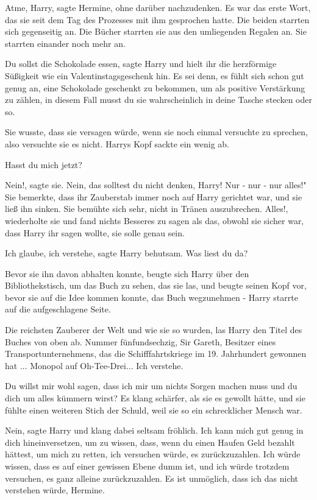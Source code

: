 \glqq Atme, Harry\grqq{}, sagte Hermine, ohne darüber nachzudenken. Es war das
erste Wort, das sie seit dem Tag des Prozesses mit ihm gesprochen hatte. Die
beiden starrten sich gegenseitig an. Die Bücher starrten sie aus den umliegenden
Regalen an. Sie starrten einander noch mehr an.

\glqq Du sollst die Schokolade essen\grqq{}, sagte Harry und hielt ihr die
herzförmige Süßigkeit wie ein Valentinstagsgeschenk hin. \glqq Es sei denn, es
fühlt sich schon gut genug an, eine Schokolade geschenkt zu bekommen, um als
positive Verstärkung zu zählen, in diesem Fall musst du sie wahrscheinlich in
deine Tasche stecken oder so.\grqq{}

Sie wusste, dass sie versagen würde, wenn sie noch einmal versuchte zu sprechen,
also versuchte sie es nicht. Harrys Kopf sackte ein wenig ab.

\glqq Hasst du mich jetzt?\grqq{}

\glqq Nein!\grqq{}, sagte sie. \glqq Nein, das solltest du nicht denken, Harry!
Nur - nur - nur alles!" Sie bemerkte, dass ihr Zauberstab immer noch auf Harry
gerichtet war, und sie ließ ihn sinken. Sie bemühte sich sehr, nicht in Tränen
auszubrechen. \glqq Alles!\grqq{}, wiederholte sie und fand nichts Besseres zu
sagen als das, obwohl sie sicher war, dass Harry ihr sagen wollte, sie solle
genau sein.

\glqq Ich glaube, ich verstehe\grqq{}, sagte Harry behutsam. \glqq Was liest du
da?\grqq{}

Bevor sie ihn davon abhalten konnte, beugte sich Harry über den
Bibliothekstisch, um das Buch zu sehen, das sie las, und beugte seinen Kopf vor,
bevor sie auf die Idee kommen konnte, das Buch wegzunehmen - Harry starrte auf
die aufgeschlagene Seite.

\glqq Die reichsten Zauberer der Welt und wie sie so wurden\grqq{}, las Harry
den Titel des Buches von oben ab. \glqq Nummer fünfundsechzig, Sir Gareth,
Besitzer eines Transportunternehmens, das die Schifffahrtskriege im 19.
Jahrhundert gewonnen hat ... Monopol auf Oh-Tee-Drei... Ich verstehe.\grqq{}

\glqq Du willst mir wohl sagen, dass ich mir um nichts Sorgen machen muss und du
dich um alles kümmern wirst?\grqq{} Es klang schärfer, als sie es gewollt hätte,
und sie fühlte einen weiteren Stich der Schuld, weil sie so ein schrecklicher
Mensch war.

\glqq Nein\grqq{}, sagte Harry und klang dabei seltsam fröhlich. \glqq Ich kann
mich gut genug in dich hineinversetzen, um zu wissen, dass, wenn du einen Haufen
Geld bezahlt hättest, um mich zu retten, ich versuchen würde, es zurückzuzahlen.
Ich würde wissen, dass es auf einer gewissen Ebene dumm ist, und ich würde
trotzdem versuchen, es ganz alleine zurückzuzahlen. Es ist unmöglich, dass ich
das nicht verstehen würde, Hermine.\grqq{}

